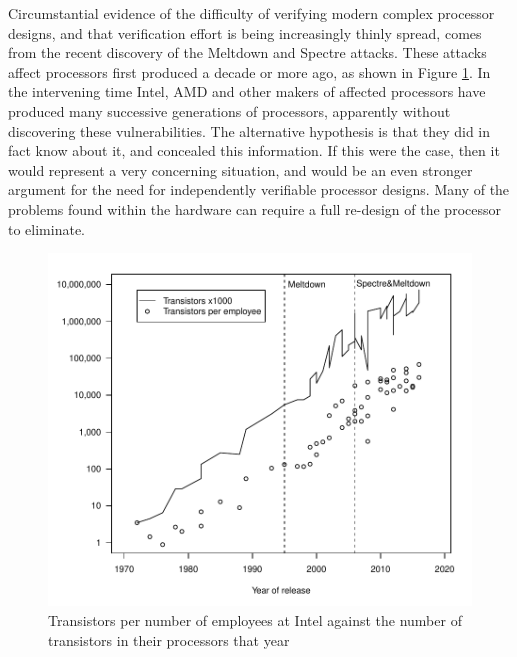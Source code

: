 Circumstantial evidence of the difficulty of verifying modern complex processor designs, and that verification effort is being increasingly thinly spread, comes from the recent discovery of the Meltdown and Spectre attacks.
These attacks affect processors first produced a decade or more ago, as shown in Figure \ref{fig:transistor_graph}.
In the intervening time Intel, AMD and other makers of affected processors have produced many successive generations of processors, apparently without discovering these vulnerabilities.
The alternative hypothesis is that they did in fact know about it, and concealed this information.
If this were the case, then it would represent a very concerning situation, and would be an even stronger argument for the need for independently verifiable processor designs.
Many of the problems found within the hardware can require a full re-design of the processor to eliminate.

\begin{figure}
	\includegraphics[width=\linewidth]{cpu-complexity/cpucomplexity.pdf}
	\caption{Transistors per number of employees at Intel against the number of transistors in their processors that year \citep{RN22, RN23, RN24, RN25, RN26}}
	\label{fig:transistor_graph}
\end{figure}


